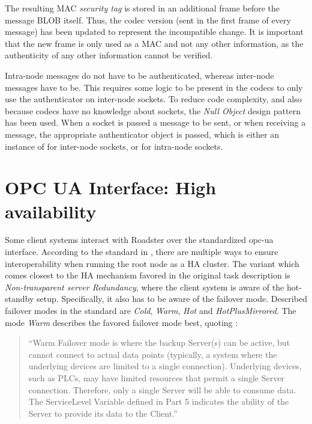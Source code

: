 The resulting MAC \emph{security tag} is stored in an additional \zmq frame
before the message BLOB itself. Thus, the codec version (sent in the first
frame of every message) has been updated to represent the incompatible change.
It is important that the new frame is only used as a MAC and not any other
information, as the authenticity of any other information cannot be verified.

Intra-node messages do not have to be authenticated, whereas inter-node
messages have to be. This requires some logic to be present in the codecs
to only use the authenticator on inter-node sockets. To reduce
code complexity, and also because codecs have no knowledge about sockets, the
\emph{Null Object} design pattern has been used. When a socket is passed a
message to be sent, or when receiving a message, the appropriate authenticator
object is passed, which is either an instance of
 for inter-node sockets, or
 for intra-node sockets.


\section{OPC UA Interface: High availability}\label{sec:approach:opc-ua}
Some client systems interact with Roadster over the standardized \gls{opc-ua}
interface. According to the standard in \cite[6.4.2 Server Redundancy,
p.~94]{opc-ua:behavior:server-redundancy}, there are multiple ways to ensure
interoperability when running the root node as a \gls{HA} cluster. The variant
which comes closest to the \gls{HA} mechanism favored in the original task description is
\emph{Non-transparent server Redundancy}, where the client system is aware of
the hot-standby setup. Specifically, it also has to be aware of the failover
mode. Described failover modes in the standard are \emph{Cold}, \emph{Warm},
\emph{Hot} and \emph{HotPlusMirrored}. The mode \emph{Warm} describes the
favored failover mode best, quoting \cite[6.4.2.4.4 Server Failover Modes,
p.~98]{opc-ua:behavior:server-redundancy}:


\begin{quote}
``Warm Failover mode is where the backup Server(s) can be active, but cannot
connect to actual data points (typically, a system where the underlying devices
are limited to a single connection). Underlying devices, such as PLCs, may have
limited resources that permit a single Server connection. Therefore, only a
single Server will be able to consume data. The ServiceLevel Variable defined
in Part 5 indicates the ability of the Server to provide its data to the
Client.''
\end{quote}


